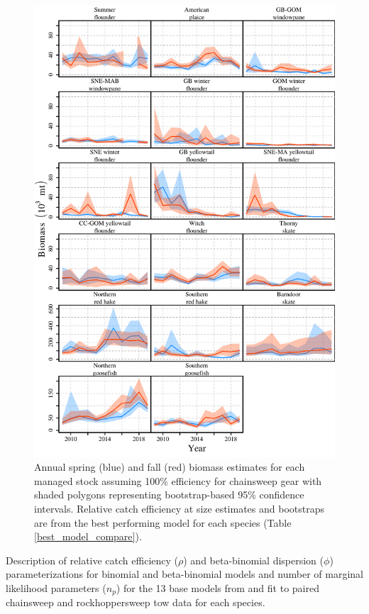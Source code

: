 \documentclass[]{article}
\begin{document}
\begin{figure}
\caption{Annual spring (blue) and fall (red) biomass estimates for each managed stock assuming 100\% efficiency for chainsweep gear with shaded polygons representing bootstrap-based 95\% confidence intervals. Relative catch efficiency at size estimates and bootstraps are from the best performing model for each species (Table \ref{best_model_compare}).}\label{stock_biomass_plot}
\begin{center}
\includegraphics[height = 0.8\textheight]{stock_biomass_plot.pdf}
\end{center}
\end{figure}

\begin{landscape}
\begin{table}
\caption{Description of relative catch efficiency ($\rho$) and beta-binomial dispersion ($\phi$) parameterizations for binomial and beta-binomial models and number of marginal likelihood parameters ($n_p$) for the 13 base models from \citet{miller13} and fit to paired chainsweep and rockhoppersweep tow data for each species.}\label{base_model_description}
{}
\end{table}
\end{landscape}
\end{document}
